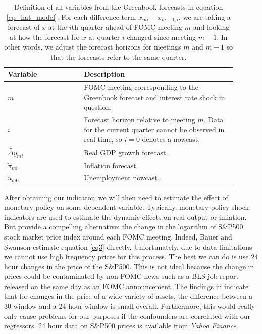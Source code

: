 \documentclass[a4paper,man,floatsintext,natbib]{apa6}
\begin{document}
	\begin{table}[ht]
		\centering
		\begin{tabular}{p{0.30\linewidth}  p{0.6\linewidth}}
			\toprule
			Variable & Description \\ 
			\midrule  
			\(m\) & FOMC meeting corresponding to the Greenbook forecast and interest rate shock in question. \\
			\(i\) & Forecast horizon relative to meeting \(m\). Data for the current quarter cannot be observed in real time, so \(i=0\) denotes a nowcast. \\
			\(\widetilde{\Delta y}_{mi}\) &  Real GDP growth forecast.\\
			\(\tilde{\pi}_{mi}\)& Inflation forecast.\\
			\(\tilde{u}_{m0}\) & Unemployment nowcast. \\
			\bottomrule
		\end{tabular}
		\caption{Definition of all variables from the Greenbook forecasts in equation \ref{ep_hat_model}. For each difference term \(x_{mi}-x_{m-1,i}\), we are taking a forecast of \(x\) at the \(i\)th quarter ahead of FOMC meeting \(m\) and looking at how the forecast for \(x\) at quarter \(i\) changed since meeting \(m-1\). In other words, we adjust the forecast horizons for meetings \(m\) and \(m-1\) so that the forecasts refer to the same quarter.}
		\label{gbvars}
	\end{table}
	
	After obtaining our indicator, we will then need to estimate the effect of monetary policy on some dependent variable. Typically, monetary policy shock indicators are used to estimate the dynamic effects on real output or inflation. But \cite{Bauer2020} provide a compelling alternative: the change in the logarithm of S\&P500 stock market price index around each FOMC meeting. Indeed, Bauer and Swanson estimate equation \ref{eq3} directly. Unfortunately, due to data limitations we cannot use high frequency prices for this process. The best we can do is use 24 hour changes in the price of the S\&P500. This is not ideal because the change in prices could be contaminated by non-FOMC news such as a BLS job report released on the same day as an FOMC announcement. The findings in \cite{Gurkaynak2011} indicate that for changes in the price of a wide variety of assets, the difference between a 30 window and a 24 hour window is small overall. Furthermore, this would really only cause problems for our purposes if the confounders are correlated with our regressors. 24 hour data on S\&P500 prices is available from \textit{Yahoo Finance}.
\end{document}
